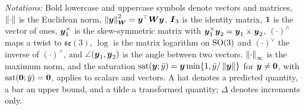 \textit{Notations:} Bold lowercase and uppercase symbols denote vectors and matrices, $\left\lVert \cdot \right\rVert$ is the Euclidean norm, $\left\lVert \boldsymbol{y} \right\rVert_{\boldsymbol{W}}^{2}=\boldsymbol{y}^{\top}\boldsymbol{W}\boldsymbol{y}$, $\boldsymbol{I}_{3}$ is the identity matrix, $\boldsymbol{1}$ is the vector of ones, $\boldsymbol{y}_{1}^{\times}$ is the skew-symmetric matrix with $\boldsymbol{y}_{1}^{\times}\boldsymbol{y}_{2}=\boldsymbol{y}_{1}\times\boldsymbol{y}_{2}$, $(\cdot)^{\wedge}$ maps a twist to $\mathfrak{se}(3)$, $\log$ is the matrix logarithm on $\mathrm{SO}(3)$ and $(\cdot)^{\vee}$ the inverse of $(\cdot)^{\times}$, and $\angle(\boldsymbol{y}_{1},\boldsymbol{y}_{2})$ is the angle between two vectors. $\left\lVert \cdot \right\rVert_{\infty}$ is the maximum norm, and the saturation $\operatorname{sat}(\boldsymbol{y};\bar y)=\boldsymbol{y}\min\{1,\bar y/\left\lVert \boldsymbol{y} \right\rVert\}$ for $\boldsymbol{y}\neq\boldsymbol{0}$, with $\operatorname{sat}(\boldsymbol{0};\bar y)=\boldsymbol{0}$, applies to scalars and vectors. A hat denotes a predicted quantity, a bar an upper bound, and a tilde a transformed quantity; $\Delta$ denotes increments only.
